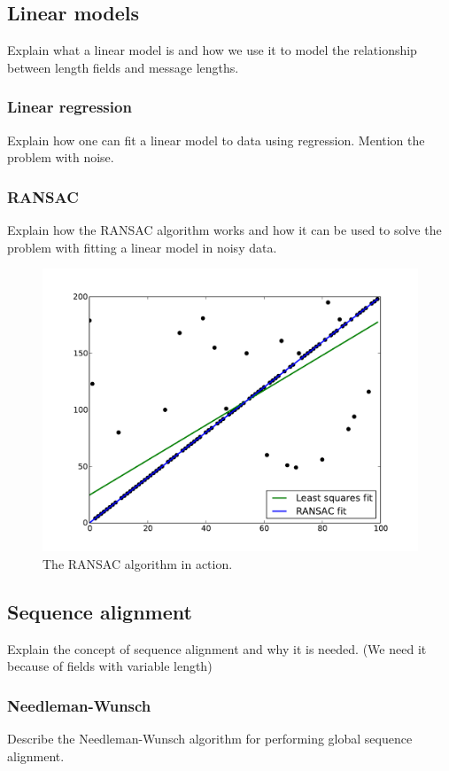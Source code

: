\documentclass[a4paper]{report}
\begin{document}
\subsection{Linear models}
Explain what a linear model is and how we use it to model the relationship
between length fields and message lengths.

\subsubsection{Linear regression}
Explain how one can fit a linear model to data using regression. Mention the
problem with noise.

\subsubsection{RANSAC}
Explain how the RANSAC algorithm works and how it can be used to solve the
problem with fitting a linear model in noisy data.

\begin{figure}
    \includegraphics[width=\linewidth]{ransac}
    \caption{The RANSAC algorithm in action.}
\end{figure}

\subsection{Sequence alignment}
Explain the concept of sequence alignment and why it is needed. (We need it
because of fields with variable length)

\subsubsection{Needleman-Wunsch}
Describe the Needleman-Wunsch algorithm for performing global sequence
alignment.
\end{document}
